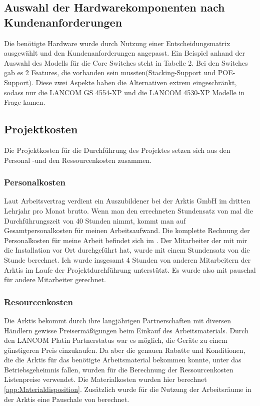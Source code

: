 \subsection{Auswahl der Hardwarekomponenten nach Kundenanforderungen}
\label{app:Auswahl der Hardwarekomponenten nach Kundenanforderungen}
Die benötigte Hardware wurde durch Nutzung einer Entscheidungsmatrix ausgewählt und den Kundenanforderungen angepasst. Ein Beispiel anhand der Auswahl des Modells für die Core Switches steht in Tabelle 2. Bei den Switches gab es 2 Features, die vorhanden sein mussten(Stacking-Support und \ac{POE}-Support). Diese zwei Aspekte haben die Alternativen extrem eingeschränkt, sodass nur die LANCOM GS 4554-XP und die LANCOM 4530-XP Modelle in Frage kamen. 

\subsection{Projektkosten}
\label{sec:Projektkosten}
Die Projektkosten für die Durchführung des Projektes setzen sich aus den Personal -und den Ressourcenkosten zusammen.
\subsubsection{Personalkosten}
Laut Arbeitsvertrag verdient ein Auszubildener bei der Arktis GmbH im dritten Lehrjahr pro Monat  brutto. 
Wenn man den errechneten Stundensatz von  mal die Durchführungszeit von 40 Stunden nimmt, kommt man auf  Gesamtpersonalkosten für meinen Arbeitsaufwand. Die komplette Rechnung der Personalkosten für meine Arbeit befindet sich im . 
Der Mitarbeiter der mit mir die Installation vor Ort durchgeführt hat, wurde mit einem Stundensatz von  die Stunde berechnet. Ich wurde insgesamt 4 Stunden von anderen Mitarbeitern der \ac{Arktis} im Laufe der Projektdurchführung unterstützt. Es wurde also mit  pauschal für andere Mitarbeiter gerechnet.

\subsubsection{Resourcenkosten}
Die \ac{Arktis} bekommt durch ihre langjährigen Partnerschaften mit diversen Händlern gewisse Preisermäßigungen beim Einkauf des Arbeitsmaterials. Durch den LANCOM Platin Partnerstatus war es möglich, die Geräte zu einem günstigeren Preis einzukaufen. Da aber die genauen Rabatte und Konditionen, die die \ac{Arktis} für das benötigte Arbeitsmaterial bekommen konnte, unter das Betriebsgeheimnis fallen, wurden für die Berechnung der Ressourcenkosten Listenpreise verwendet. Die Materialkosten wurden hier berechnet \ref{app:Materialdisposition}. Zusätzlich wurde für die Nutzung der Arbeitsräume in der \ac{Arktis} eine Pauschale von  berechnet.

